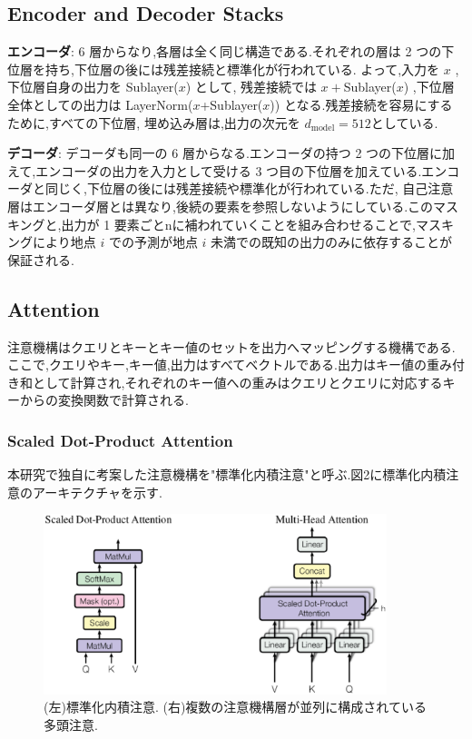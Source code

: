\documentclass{jarticle}     %
\begin{document}
\subsection{Encoder and Decoder Stacks}
\textbf{エンコーダ}: 6 層からなり,各層は全く同じ構造である.それぞれの層は 2 つの下位層を持ち,下位層の後には残差接続と標準化が行われている.
よって,入力を $x$ , 下位層自身の出力を Sublayer($x$) として, 残差接続では $x+$Sublayer($x$) ,下位層全体としての出力は LayerNorm($x$+Sublayer($x$)) となる\cite{残差接続}.残差接続を容易にするために,すべての下位層, 埋め込み層は,出力の次元を $d_\mathrm{model}=512$としている.\par
\par
\textbf{デコーダ}: デコーダも同一の 6 層からなる.エンコーダの持つ 2 つの下位層に加えて,エンコーダの出力を入力として受ける 3 つ目の下位層を加えている.エンコーダと同じく,下位層の後には残差接続や標準化が行われている.ただ, 自己注意層はエンコーダ層とは異なり,後続の要素を参照しないようにしている.このマスキングと,出力が 1 要素ごとnに補われていくことを組み合わせることで,マスキングにより地点 $i$ での予測が地点 $i$ 未満での既知の出力のみに依存することが保証される.

\subsection{Attention}
注意機構はクエリとキーとキー値のセットを出力へマッピングする機構である.ここで,クエリやキー,キー値,出力はすべてベクトルである.出力はキー値の重み付き和として計算され,それぞれのキー値への重みはクエリとクエリに対応するキーからの変換関数で計算される.

\subsubsection{Scaled Dot-Product Attention}
本研究で独自に考案した注意機構を"標準化内積注意"と呼ぶ.図2に標準化内積注意のアーキテクチャを示す.\par

\begin{figure}[ht]
  \centering
  \includegraphics[width=100mm]{assets/Figure2.eps}

  \caption{(左)標準化内積注意. (右)複数の注意機構層が並列に構成されている多頭注意.}
  \label{Figure2}
\end{figure}
\end{document}
